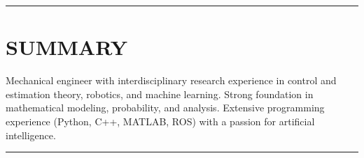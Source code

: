 \documentclass{res}
\begin{document}
\address{evangravelle@gmail.com $\cdot$ (805) 205-4318 $\cdot$ github/evangravelle}

 
\begin{resume}

%
%

\vspace*{-3ex}
\hspace{-8.5ex}\rule{16.5cm}{0.4pt}
\vspace*{-3ex}
\section{SUMMARY}
\vspace{1ex}
Mechanical engineer with interdisciplinary research experience in control and estimation theory, robotics, and machine learning. Strong foundation in mathematical modeling, probability, and analysis. Extensive programming experience (Python, C++, MATLAB, ROS) with a passion for artificial intelligence. 

\vspace*{-3ex}
\hspace{-8.5ex}\rule{16.5cm}{0.4pt}
\vspace*{-3ex}

\end{resume}
\end{document}
